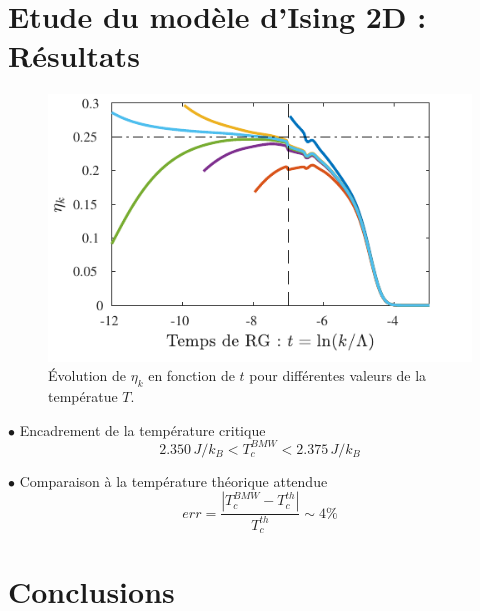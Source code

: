 \documentclass[9pt]{beamer}
\begin{document}
		
		\section{Etude du modèle d'Ising 2D : Résultats}
		\sommaire{}
		\begin{frame}
	\justifying
	\vspace*{22pt}
	
	\begin{figure}[H]
\begin{center}
	\includegraphics[scale=0.7]{MesuRes.pdf}
\end{center}
\caption{Évolution de $\eta_k$ en fonction de $t$ pour différentes valeurs de la températue $T$.}
\label{fig:etaMesu}
\end{figure}

$\bullet$ Encadrement de la température critique
\begin{equation}
2.350 \, J/k_B < T_c^{BMW}  < 2.375 \, J/k_B
\end{equation}

$\bullet $ Comparaison à la température théorique attendue
\begin{equation}
	err = \frac{ |T_c^{BMW} - T_c^{th}|}{T_c^{th}} \sim 4 \%
\end{equation}



	
	\end{frame}

	
	\section{Conclusions}
	
	\sommaire{}
	
\end{document}
